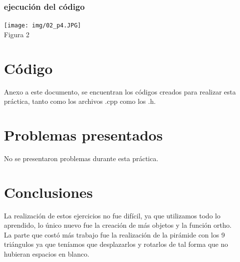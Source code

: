 \documentclass[12pt, a4paper]{article}
\begin{document}
	\subsubsection{ejecución del código}
		\centering 
	\texttt{[image: img/02\_p4.JPG]}\\[.25cm] %
	Figura 2 \\[.55cm]
	\vspace{0.4 cm}
	
\raggedright 
\section{Código}
Anexo a este documento, se encuentran los códigos creados para realizar esta práctica, tanto como los archivos .cpp como los .h.\\

 \raggedright 	
\section{Problemas presentados}
\justify
No se presentaron problemas durante esta práctica. \\[.2cm]

\section{Conclusiones}
\justify
La realización de estos ejercicios no fue difícil, ya que utilizamos todo lo aprendido, lo único nuevo fue la creación de más objetos y la función ortho. \\[0.4cm]
La parte que costó más trabajo fue la realización de la pirámide con los 9 triángulos ya que teníamos que desplazarlos y rotarlos de tal forma que no hubieran espacios en blanco.
\end{document}
